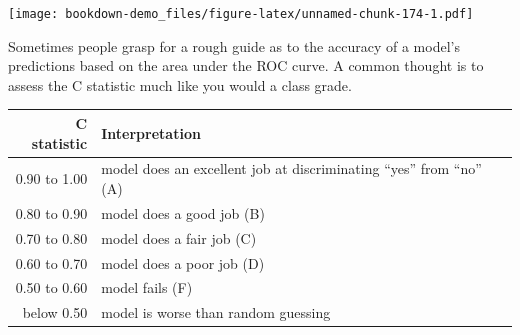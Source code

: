 \documentclass[]{book}
\theoremstyle{definition}
\theoremstyle{definition}
\theoremstyle{definition}
\theoremstyle{remark}
\begin{document}
\texttt{[image: bookdown-demo\_files/figure-latex/unnamed-chunk-174-1.pdf]}

Sometimes people grasp for a rough guide as to the accuracy of a model's
predictions based on the area under the ROC curve. A common thought is
to assess the C statistic much like you would a class grade.

\begin{longtable}[]{@{}rl@{}}
\toprule
\begin{minipage}[b]{0.16\columnwidth}\raggedleft\strut
C statistic\strut
\end{minipage} & \begin{minipage}[b]{0.60\columnwidth}\raggedright\strut
Interpretation\strut
\end{minipage}\tabularnewline
\midrule
\endhead
\begin{minipage}[t]{0.16\columnwidth}\raggedleft\strut
0.90 to 1.00\strut
\end{minipage} & \begin{minipage}[t]{0.60\columnwidth}\raggedright\strut
model does an excellent job at discriminating ``yes'' from ``no''
(A)\strut
\end{minipage}\tabularnewline
\begin{minipage}[t]{0.16\columnwidth}\raggedleft\strut
0.80 to 0.90\strut
\end{minipage} & \begin{minipage}[t]{0.60\columnwidth}\raggedright\strut
model does a good job (B)\strut
\end{minipage}\tabularnewline
\begin{minipage}[t]{0.16\columnwidth}\raggedleft\strut
0.70 to 0.80\strut
\end{minipage} & \begin{minipage}[t]{0.60\columnwidth}\raggedright\strut
model does a fair job (C)\strut
\end{minipage}\tabularnewline
\begin{minipage}[t]{0.16\columnwidth}\raggedleft\strut
0.60 to 0.70\strut
\end{minipage} & \begin{minipage}[t]{0.60\columnwidth}\raggedright\strut
model does a poor job (D)\strut
\end{minipage}\tabularnewline
\begin{minipage}[t]{0.16\columnwidth}\raggedleft\strut
0.50 to 0.60\strut
\end{minipage} & \begin{minipage}[t]{0.60\columnwidth}\raggedright\strut
model fails (F)\strut
\end{minipage}\tabularnewline
\begin{minipage}[t]{0.16\columnwidth}\raggedleft\strut
below 0.50\strut
\end{minipage} & \begin{minipage}[t]{0.60\columnwidth}\raggedright\strut
model is worse than random guessing\strut
\end{minipage}\tabularnewline
\bottomrule
\end{longtable}
\end{document}
